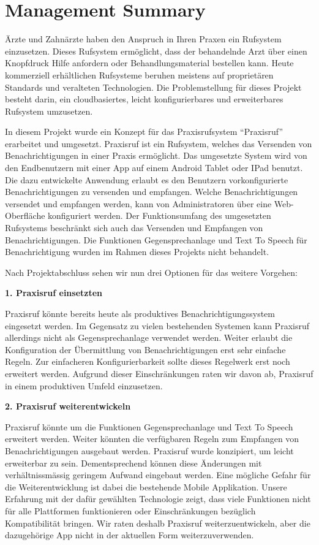 \section*{Management Summary}

Ärzte und Zahnärzte haben den Anspruch in Ihren Praxen ein Rufsystem einzusetzen.
Dieses Rufsystem ermöglicht, dass der behandelnde Arzt über einen Knopfdruck Hilfe anfordern oder Behandlungsmaterial bestellen kann.
Heute kommerziell erhältlichen Rufsysteme beruhen meistens auf proprietären Standards und veralteten Technologien.\cite{aufgabenstellung}
Die Problemstellung für dieses Projekt besteht darin, ein cloudbasiertes, leicht konfigurierbares und erweiterbares Rufsystem umzusetzen.

In diesem Projekt wurde ein Konzept für das Praxisrufsystem ``Praxisruf'' erarbeitet und umgesetzt.
Praxisruf ist ein Rufsystem, welches das Versenden von Benachrichtigungen in einer Praxis ermöglicht.
Das umgesetzte System wird von den Endbenutzern mit einer App auf einem Android Tablet oder IPad benutzt.
Die dazu entwickelte Anwendung erlaubt es den Benutzern vorkonfigurierte Benachrichtigungen zu versenden und empfangen.
Welche Benachrichtigungen versendet und empfangen werden, kann von Administratoren über eine Web-Oberfläche konfiguriert werden.
Der Funktionsumfang des umgesetzten Rufsystems beschränkt sich auch das Versenden und Empfangen von Benachrichtigungen.
Die Funktionen Gegensprechanlage und Text To Speech für Benachrichtigung wurden im Rahmen dieses Projekts nicht behandelt.

Nach Projektabschluss sehen wir nun drei Optionen für das weitere Vorgehen:


\textbf{1. Praxisruf einsetzten}

Praxisruf könnte bereits heute als produktives Benachrichtigungssystem eingesetzt werden.
Im Gegensatz zu vielen bestehenden Systemen kann Praxisruf allerdings nicht als Gegensprechanlage verwendet werden.
Weiter erlaubt die Konfiguration der Übermittlung von Benachrichtigungen erst sehr einfache Regeln.
Zur einfacheren Konfigurierbarkeit sollte dieses Regelwerk erst noch erweitert werden.
Aufgrund dieser Einschränkungen raten wir davon ab, Praxisruf in einem produktiven Umfeld einzusetzen.

\textbf{2. Praxisruf weiterentwickeln}

Praxisruf könnte um die Funktionen Gegensprechanlage und Text To Speech erweitert werden.
Weiter könnten die verfügbaren Regeln zum Empfangen von Benachrichtigungen ausgebaut werden.
Praxisruf wurde konzipiert, um leicht erweiterbar zu sein.
Dementsprechend können diese Änderungen mit verhältnissmässig geringem Aufwand eingebaut werden.
Eine mögliche Gefahr für die Weiterentwicklung ist dabei die bestehende Mobile Applikation.
Unsere Erfahrung mit der dafür gewählten Technologie zeigt, dass viele Funktionen nicht für alle Plattformen funktionieren
oder Einschränkungen bezüglich Kompatibilität bringen.
Wir raten deshalb Praxisruf weiterzuentwickeln, aber die dazugehörige App nicht in der aktuellen Form weiterzuverwenden.


